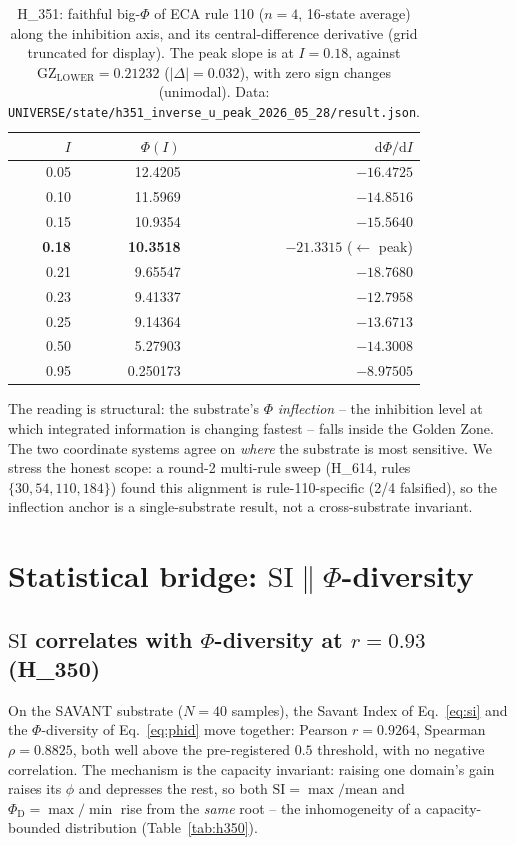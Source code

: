\documentclass[11pt,a4paper]{article}
\newcommand{\GZL}{\mathrm{GZ_{LOWER}}}
\newcommand{\Svi}{\mathrm{SI}}
\newcommand{\PhiD}{\Phi_{\mathrm{D}}}
\begin{document}
\begin{table}[h]
\centering
\small
\begin{tabular}{rrr}
\toprule
\textbf{$I$} & \textbf{$\Phi(I)$} & \textbf{$\mathrm{d}\Phi/\mathrm{d}I$} \\
\midrule
0.05 & 12.4205 & $-16.4725$ \\
0.10 & 11.5969 & $-14.8516$ \\
0.15 & 10.9354 & $-15.5640$ \\
\textbf{0.18} & \textbf{10.3518} & $\mathbf{-21.3315}$ \;($\leftarrow$ peak) \\
0.21 & 9.65547 & $-18.7680$ \\
0.23 & 9.41337 & $-12.7958$ \\
0.25 & 9.14364 & $-13.6713$ \\
0.50 & 5.27903 & $-14.3008$ \\
0.95 & 0.250173 & $-8.97505$ \\
\bottomrule
\end{tabular}
\caption{H\_351: faithful big-$\Phi$ of ECA rule 110 ($n=4$, 16-state
average) along the inhibition axis, and its central-difference derivative
(grid truncated for display). The peak slope is at $I=0.18$, against
$\GZL=0.21232$ ($|\Delta|=0.032$), with zero sign changes (unimodal). Data:
\texttt{UNIVERSE/state/h351\_inverse\_u\_peak\_2026\_05\_28/result.json}.}
\label{tab:h351}
\end{table}

The reading is structural: the substrate's $\Phi$ \emph{inflection} -- the
inhibition level at which integrated information is changing fastest --
falls inside the Golden Zone. The two coordinate systems agree on
\emph{where} the substrate is most sensitive. We stress the honest scope:
a round-2 multi-rule sweep (H\_614, rules $\{30,54,110,184\}$) found this
alignment is rule-110-specific (2/4 falsified), so the inflection anchor
is a single-substrate result, not a cross-substrate invariant.

\section{Statistical bridge: $\Svi \parallel \Phi$-diversity}
\label{sec:bridge}

\subsection{$\Svi$ correlates with $\Phi$-diversity at $r=0.93$ (H\_350)}
On the SAVANT substrate ($N=40$ samples), the Savant Index of
Eq.~\eqref{eq:si} and the $\Phi$-diversity of Eq.~\eqref{eq:phid} move
together: Pearson $r=0.9264$, Spearman $\rho=0.8825$, both well above the
pre-registered $0.5$ threshold, with no negative correlation. The
mechanism is the capacity invariant: raising one domain's gain raises its
$\phi$ and depresses the rest, so both $\Svi=\max/\mathrm{mean}$ and
$\PhiD=\max/\min$ rise from the \emph{same} root -- the inhomogeneity of a
capacity-bounded distribution (Table~\ref{tab:h350}).
\end{document}
